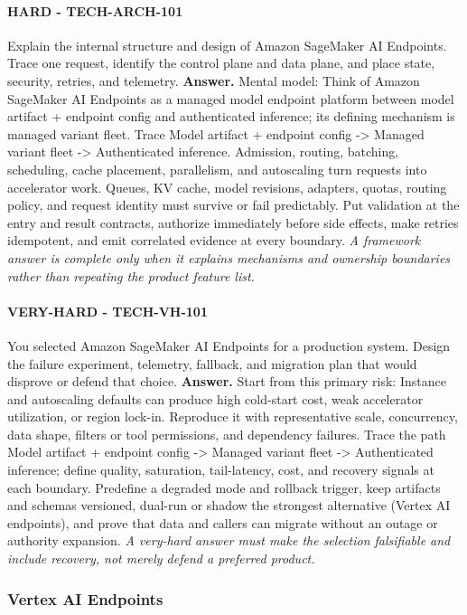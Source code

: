 \paragraph{HARD - TECH-ARCH-101} Explain the internal structure and design of Amazon SageMaker AI Endpoints. Trace one request, identify the control plane and data plane, and place state, security, retries, and telemetry.
\textbf{Answer.} Mental model: Think of Amazon SageMaker AI Endpoints as a managed model endpoint platform between model artifact + endpoint config and authenticated inference; its defining mechanism is managed variant fleet. Trace Model artifact + endpoint config -> Managed variant fleet -> Authenticated inference. Admission, routing, batching, scheduling, cache placement, parallelism, and autoscaling turn requests into accelerator work. Queues, KV cache, model revisions, adapters, quotas, routing policy, and request identity must survive or fail predictably. Put validation at the entry and result contracts, authorize immediately before side effects, make retries idempotent, and emit correlated evidence at every boundary.
\textit{A framework answer is complete only when it explains mechanisms and ownership boundaries rather than repeating the product feature list.}
\paragraph{VERY-HARD - TECH-VH-101} You selected Amazon SageMaker AI Endpoints for a production system. Design the failure experiment, telemetry, fallback, and migration plan that would disprove or defend that choice.
\textbf{Answer.} Start from this primary risk: Instance and autoscaling defaults can produce high cold-start cost, weak accelerator utilization, or region lock-in. Reproduce it with representative scale, concurrency, data shape, filters or tool permissions, and dependency failures. Trace the path Model artifact + endpoint config -> Managed variant fleet -> Authenticated inference; define quality, saturation, tail-latency, cost, and recovery signals at each boundary. Predefine a degraded mode and rollback trigger, keep artifacts and schemas versioned, dual-run or shadow the strongest alternative (Vertex AI endpoints), and prove that data and callers can migrate without an outage or authority expansion.
\textit{A very-hard answer must make the selection falsifiable and include recovery, not merely defend a preferred product.}
\subsubsection*{Vertex AI Endpoints}
